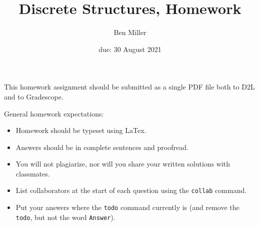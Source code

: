 \documentclass{article}
\title{Discrete Structures, Homework \hwnum}
\author{Ben Miller}
\date{due: 30 August 2021}
\begin{document}
\maketitle


This homework assignment should be
submitted as a single PDF file both to D2L and to Gradescope.

General homework expectations:
\begin{itemize}
      \item Homework should be typeset using LaTex.
      \item Answers should be in complete sentences and proofread.
      \item You will not plagiarize, nor will you share your written solutions
            with classmates.
      \item List collaborators at the start of each question using the
            \texttt{collab} command.
      \item Put your answers where the \texttt{todo} command currently is (and
            remove the \texttt{todo}, but not the word \texttt{Answer}).
\end{itemize}

\end{document}
